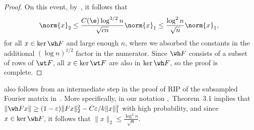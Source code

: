 \begin{proof}
    On this event, by~, it follows that
    \begin{equation}
         \norm{x}_2 \leq \frac{C(\e)\log^{3/2} n}{\sqrt{cn}} \norm{x}_1 \leq \frac{\log^2 n}{\sqrt{n}} \norm{x}_1,
    \end{equation}
    for all \(x \in \ker \wh F\) and large enough $n$, where we absorbed the constants in the additional $(\log n)^{1/2}$ factor in the numerator. Since $\wh F$ consists of a subset of rows of $\wt F$, all \(x \in \ker \wt F\) are also in \(\ker \wh F\), so the proof is complete. 
\end{proof}

\begin{remark}
 also follows from an intermediate step in the proof of RIP of the subsampled Fourier matrix in~\cite{haviv2017restricted}. 
More specifically, in our notation \cite{haviv2017restricted},~Theorem~3.1 implies that $\|\wh F x\| \ge (1 - \varepsilon) \| F x\|^2_2 - C \varepsilon / k \| x \|_1^2$ with high probability, and since $x \in \ker \wh F$, it follows that $\|x\|_2 \le \frac{ \log^{2}n}{\sqrt{n}}$.
\end{remark}


